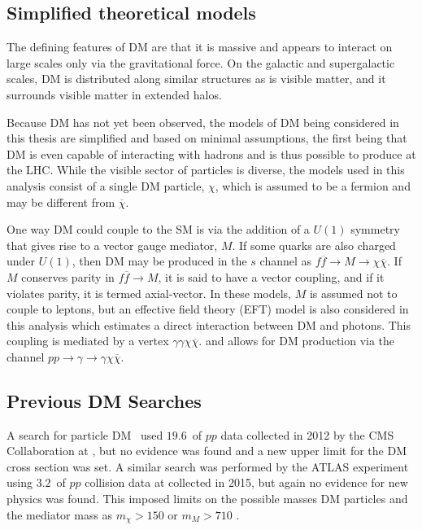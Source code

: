 %

  \subsection{Simplified theoretical models} 

  The defining features of DM are that
   it is massive and appears to interact
   on large scales only via the gravitational force.
  On the galactic and supergalactic scales,
   DM is distributed along similar structures
   as is visible matter, and it surrounds 
   visible matter in extended halos. 

  Because DM has not yet been observed, 
   the models of DM being considered in this thesis are
   simplified and based on minimal assumptions,
   the first being that DM is even capable of interacting
   with hadrons and is thus possible to produce
   at the LHC.
  While the visible sector of particles is diverse,
   the models used in this analysis
   consist of a single DM particle,
   $\chi$, which is assumed to be a fermion
   and may be different from $\overline{\chi}$.

  One way DM could couple to the SM is via the
   addition of a $U(1)$ symmetry that
   gives rise to a vector gauge mediator, $M$.
  If some quarks are also charged under
   $U(1)$, then DM may be produced in the
   $s$ channel as
   $f\overline{f}\rightarrow M\rightarrow\chi\overline{\chi}$.
  If $M$ conserves parity in $f\overline{f}\rightarrow M$,
   it is said to have a vector coupling,
   and if it violates parity, it is
   termed axial-vector.
  In these models, $M$ is assumed not
   to couple to leptons, but
   an effective field theory (EFT)
   model is also considered in this analysis
   which estimates a direct interaction
   between DM and photons. 
  This coupling is mediated by a vertex
   $\gamma\gamma\chi\overline{\chi}$.
   and allows for DM production via
   the channel
   $pp\rightarrow\gamma\rightarrow\gamma\chi\overline{\chi}$.


\subsection{Previous DM Searches}

A search for particle DM~\cite{Khachatryan:2014rwa}
  used $19.6$~\fbinv of $pp$ data collected in 2012 by the CMS Collaboration at
  \TeV, but no evidence was found and a new upper limit
 for the DM cross section was set.
A similar search was performed by the ATLAS experiment~\cite{Aaboud:2016uro}
 using $3.2$~\fbinv of $pp$ collision data at  \TeV
 collected in 2015, but again  no evidence for new physics was found. 
This imposed limits on the possible masses DM particles
 and the mediator mass as $m_\chi > 150$ \GeV or
 $m_M > 710$ \GeV.
